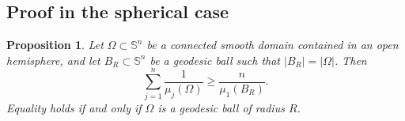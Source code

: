 \documentclass[10pt,a4paper]{amsart}
\newtheorem{proposition}[theorem]{Proposition}
\newcommand{\Sn}{\mathbb S}
\begin{document}
\subsection{Proof in the spherical case}

\begin{proposition}\label{prop:spherical}
Let $\Omega\subset\Sn^n$ be a connected smooth domain contained in an open hemisphere, and let $B_R\subset\Sn^n$ be a geodesic ball such that $|B_R|=|\Omega|$.  Then
\begin{equation}\label{eq:spherical-conclusion}
        \sum_{j=1}^n\frac1{\mu_j(\Omega)}
        \ge
        \frac{n}{\mu_1(B_R)}.
\end{equation}
Equality holds if and only if $\Omega$ is a geodesic ball of radius $R$.
\end{proposition}
\end{document}
